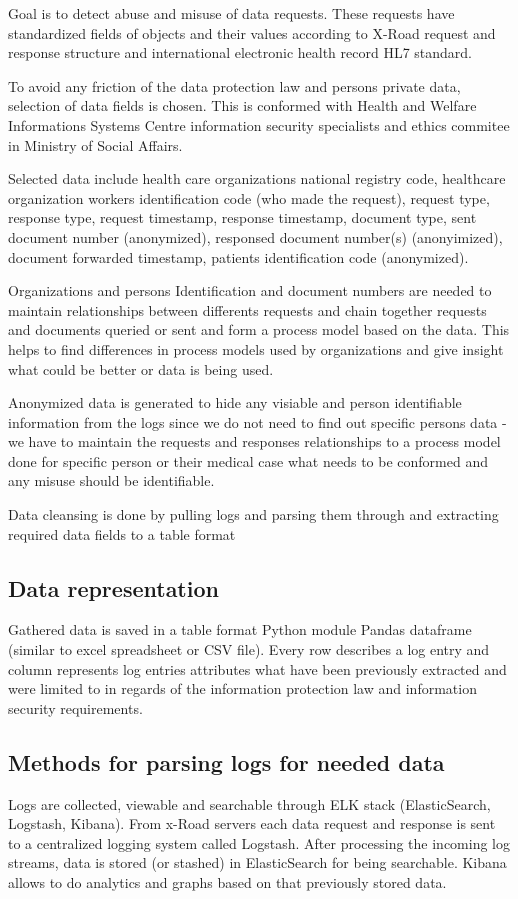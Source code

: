 \documentclass[a4paper, 12pt]{article}
\begin{document}
Goal is to detect abuse and misuse of data requests. These requests have standardized fields of objects and their values according to X-Road request and response structure and international electronic health record HL7 standard. 

To avoid any friction of the data protection law and persons private data, selection of data fields is chosen. This is conformed with Health and Welfare Informations Systems Centre information security specialists and ethics commitee in Ministry of Social Affairs. 

Selected data include health care organizations national registry code, healthcare organization workers identification code (who made the request), request type, response type, request timestamp, response timestamp, document type, sent document number (anonymized), responsed document number(s) (anonyimized), document forwarded timestamp, patients identification code (anonymized). 

Organizations and persons Identification and document numbers are needed to maintain relationships between differents requests and chain together requests and documents queried or sent and form a process model based on the data. This helps to find differences in process models used by organizations and give insight what could be better or data is being used. 

Anonymized data is generated to hide any visiable and person identifiable information from the logs since we do not need to find out specific persons data - we have to maintain the requests and responses relationships to a process model done for specific person or their medical case what needs to be conformed and any misuse should be identifiable. 

Data cleansing is done by pulling logs and parsing them through and extracting required data fields to a table format 

\subsection{Data representation}
Gathered data is saved in a table format Python module Pandas dataframe (similar to excel spreadsheet or CSV file). Every row describes a log entry and column represents log entries attributes what have been previously extracted and were limited to in regards of the information protection law and information security requirements. 

\subsection{Methods for parsing logs for needed data}
Logs are collected, viewable and searchable through ELK stack (ElasticSearch, Logstash, Kibana). From x-Road servers each data request and response is sent to a centralized logging system called Logstash. After processing the incoming log streams, data is stored (or stashed) in ElasticSearch for being searchable. Kibana allows to do analytics and graphs based on that previously stored data. 
\end{document}

